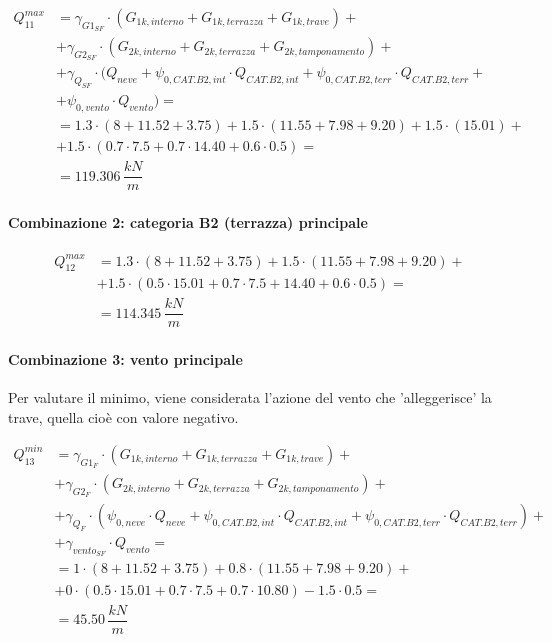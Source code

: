 \begin{align*}
	Q_{11}^{max} &=\gamma_{G1_{SF}}\cdot\left( G_{1k, interno} + G_{1k, terrazza} + G_{1k, trave} \right) +\\
	&+\gamma_{G2_{SF}}\cdot\left( G_{2k, interno} + G_{2k, terrazza} + G_{2k, tamponamento} \right) +\\
	&+\gamma_{Q_{SF}}\cdot (Q_{neve} + \psi_{0,CAT.B2,int}\cdot Q_{CAT.B2,int} + \psi_{0,CAT.B2,terr}\cdot Q_{CAT.B2,terr} +\\
	&+\psi_{0,vento}\cdot Q_{vento}) =\\
	&= 1.3\cdot(8+11.52 + 3.75)	+1.5\cdot(11.55+7.98 + 9.20) + 1.5\cdot(15.01) +\\
	&+1.5\cdot(0.7\cdot7.5+ 0.7\cdot 14.40 + 0.6\cdot 0.5) = \\
	&= 	119.306\,\dfrac{kN}{m}
\end{align*}






\paragraph{Combinazione 2: categoria B2 (terrazza) principale}

\begin{align*}
	Q_{12}^{max} &= 1.3\cdot(8+11.52 + 3.75) 
	+1.5\cdot(11.55+7.98 + 9.20) +\\
	&+1.5\cdot(0.5\cdot 15.01 + 0.7\cdot7.5+ 14.40 + 0.6\cdot 0.5) = \\
	&= 	114.345\,\dfrac{kN}{m}
\end{align*}

\paragraph{Combinazione 3: vento principale}
Per valutare il minimo, viene considerata l'azione del vento che 'alleggerisce' la trave, quella cioè con valore negativo.

\begin{align*}
	Q_{13}^{min} &=\gamma_{G1_{F}}\cdot\left( G_{1k, interno} + G_{1k, terrazza} + G_{1k, trave} \right) +\\
	&+\gamma_{G2_{F}}\cdot\left( G_{2k, interno} + G_{2k, terrazza} + G_{2k, tamponamento} \right) +\\
	&+\gamma_{Q_{F}}\cdot (\psi_{0,neve}\cdot Q_{neve} + \psi_{0,CAT.B2,int}\cdot Q_{CAT.B2,int} + \psi_{0,CAT.B2,terr}\cdot Q_{CAT.B2,terr}) +\\
	&+ \gamma_{vento_{SF}}\cdot Q_{vento} =\\
	&= 1\cdot(8+11.52 + 3.75) +0.8 \cdot(11.55+7.98 + 9.20) +\\
	&+ 0\cdot(0.5\cdot 15.01 + 0.7\cdot7.5+ 0.7\cdot 10.80) - 1.5\cdot 0.5 = \\
	&= 	45.50\,\dfrac{kN}{m}
\end{align*}

